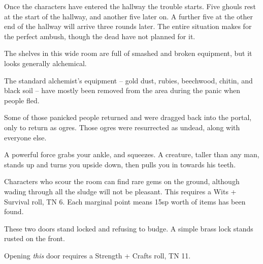 \begin{multicols}{2}
Once the characters have entered the hallway the trouble starts.  Five ghouls rest at the start of the hallway, and another five later on.  A further five at the other end of the hallway will arrive three rounds later.
The entire situation makes for the perfect ambush, though the dead have not planned for it.


\ghoul


\begin{boxtext}

	The shelves in this wide room are full of smashed and broken equipment, but it looks generally alchemical.

\end{boxtext}

The standard alchemist's equipment -- gold dust, rubies, beechwood, chitin, and black soil -- have mostly been removed from the area during the panic when people fled.

Some of those panicked people returned and were dragged back into the portal, only to return as ogres.  Those ogres were resurrected as undead, along with everyone else.

\begin{boxtext}

	A powerful force grabs your ankle, and squeezes.
	A creature, taller than any man, stands up and turns you upside down, then pulls you in towards his teeth.

\end{boxtext}



Characters who scour the room can find rare gems on the ground, although wading through all the sludge will not be pleasant.
This requires a Wits + Survival roll, TN 6.
Each marginal point means 15sp worth of items has been found.


\begin{boxtext}

	These two doors stand locked and refusing to budge.  A simple brass lock stands rusted on the front.

\end{boxtext}

Opening \emph{this} door requires a Strength + Crafts roll, TN 11.


\end{multicols}

